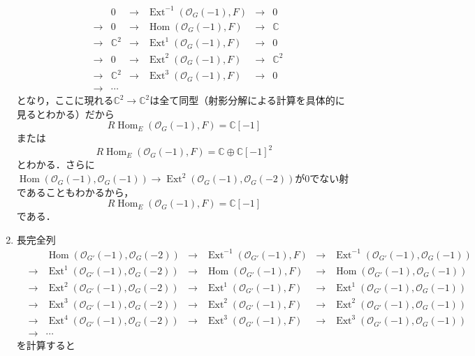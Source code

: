 \documentclass[uplatex,a4paper,11pt,dvipdfmx]{jsarticle}
\makeatletter
\theoremstyle{mystyle} %
\renewenvironment{proof}[1][\proofname]{\par
 \pushQED{\qed}%
 \normalfont \topsep6\p@\@plus6\p@\relax
 \trivlist
 \item[\hskip\labelsep
 \itshape
 {\bf\underline{#1}}]\ignorespaces
}{%
 \popQED\endtrivlist\@endpefalse
}
\DeclareMathOperator{\Hom}{Hom}
\DeclareMathOperator{\Ext}{Ext}
\makeatother
\begin{document}
\begin{proof}
\begin{enumerate}
\[\begin{array}{ccccccc}
				       &     & 0            & \to & \Ext^{-1}(\mathcal{O}_G(-1), F) & \to & 0            \\
				       & \to & 0            & \to & \Hom(\mathcal{O}_G(-1), F)      & \to & \mathbb{C}   \\
				       & \to & \mathbb{C}^2 & \to & \Ext^1(\mathcal{O}_G(-1),F)     & \to & 0            \\
				       & \to & 0            & \to & \Ext^2(\mathcal{O}_G(-1),F)     & \to & \mathbb{C}^2 \\
				       & \to & \mathbb{C}^2 & \to & \Ext^3(\mathcal{O}_G(-1),F)     & \to & 0            \\
				       & \to & \cdots       &     &                                 &
			      \end{array}
		      \]となり，ここに現れる$\mathbb{C}^2 \to \mathbb{C}^2$は全て同型（射影分解による計算を具体的に見るとわかる）だから$$R\Hom_E(\mathcal{O}_G(-1), F) = \mathbb{C}[-1]$$または$$R\Hom_E(\mathcal{O}_G(-1), F) = \mathbb{C}\oplus\mathbb{C}[-1]^2$$とわかる．さらに$\Hom(\mathcal{O}_G(-1), \mathcal{O}_G(-1)) \to \Ext^2(\mathcal{O}_G(-1), \mathcal{O}_G(-2))$が$0$でない射であることもわかるから，$$R\Hom_E(\mathcal{O}_G(-1), F) = \mathbb{C}[-1]$$である．
		\item 長完全列\[
			      \begin{array}{ccccccc}

				       &     & \Hom(\mathcal{O}_{G'}(-1), \mathcal{O}_{G}(-2))    & \to & \Ext^{-1}(\mathcal{O}_{G'}(-1), F) & \to & \Ext^{-1}(\mathcal{O}_{G'}(-1), \mathcal{O}_{G}(-1)) \\
				       & \to & \Ext^1(\mathcal{O}_{G'}(-1), \mathcal{O}_{G}(-2))  & \to & \Hom(\mathcal{O}_{G'}(-1), F)      & \to & \Hom(\mathcal{O}_{G'}(-1), \mathcal{O}_{G}(-1))      \\
				       & \to & \Ext^2(\mathcal{O}_{G'}(-1), \mathcal{O}_{G}(-2))  & \to & \Ext^1(\mathcal{O}_{G'}(-1),F)     & \to & \Ext^1(\mathcal{O}_{G'}(-1), \mathcal{O}_{G}(-1))    \\
				       & \to & \Ext^3(\mathcal{O}_{G'}(-1), \mathcal{O}_{G}(-2) ) & \to & \Ext^2(\mathcal{O}_{G'}(-1),F)     & \to & \Ext^2(\mathcal{O}_{G'}(-1), \mathcal{O}_{G}(-1))    \\
				       & \to & \Ext^4(\mathcal{O}_{G'}(-1), \mathcal{O}_{G}(-2) ) & \to & \Ext^3(\mathcal{O}_{G'}(-1),F)     & \to & \Ext^3(\mathcal{O}_{G'}(-1), \mathcal{O}_{G}(-1))    \\
				       & \to & \cdots                                             &     &                                    &
			      \end{array}
		      \]を計算すると\[
			      \begin{array}{ccccccc}


\end{array}\]
\end{enumerate}
\end{proof}
\end{document}
